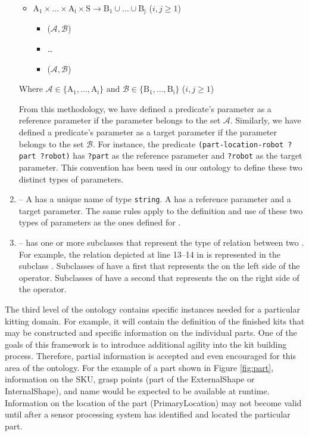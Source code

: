 \begin{enumerate}
\begin{itemize}
 \item $\mathrm{A_1\times \dots\times A_i\times S\rightarrow B_1\cup\dots\cup B_j}$ ($i, j\geq 1$)
  \begin{itemize}
  \item {}($\mathcal{A,B}$)
  \item \ldots
  \item {}($\mathcal{A,B}$)
  \end{itemize}
\end{itemize}

Where $\mathcal{A} \in \mathrm{\{A_1,\ldots,A_i\}}$ and $\mathcal{B} \in \mathrm{\{B_1,\ldots,B_i\}}$ ($i, j\geq 1$)

From this methodology, we have defined a predicate's parameter as a reference parameter if the parameter belongs to the set $\mathcal{A}$. Similarly, we have defined a predicate's parameter as a target parameter if the parameter belongs to the set $\mathcal{B}$. For instance, the predicate \texttt{(part-location-robot ?part ?robot)} has \texttt{?part} as the reference parameter and \texttt{?robot} as the target parameter. This convention has been used in our ontology to define these two distinct types of parameters.

\item {} -- A  has a unique name  of type \texttt{string}. A  has a reference parameter and a target parameter. The same rules apply to the definition and use of these two types of parameters as the ones defined for .
\item {} --  has one or more subclasses that represent the type of relation between two . For example, the relation depicted at line 13--14 in is represented in the subclass . Subclasses of  have a first  that represents the  on the left side of the operator. Subclasses of  have a second  that represents the  on the right side of the operator.
\end{enumerate}

The third level of the ontology contains specific instances needed for a particular kitting domain. For example, it will contain the definition of the finished kits that may be
constructed and specific information on the individual parts. One of the goals of this framework is to introduce additional agility into the kit building process. Therefore,
partial information is accepted and even encouraged for this area of the ontology. For the example of a part shown in Figure \ref{fig:part}, information on the SKU, grasp points 
(part of the ExternalShape or InternalShape), and name would be expected to be available at runtime. Information on the location of the part (PrimaryLocation) may not
become valid until after a sensor processing system has identified and located the particular part.
%

